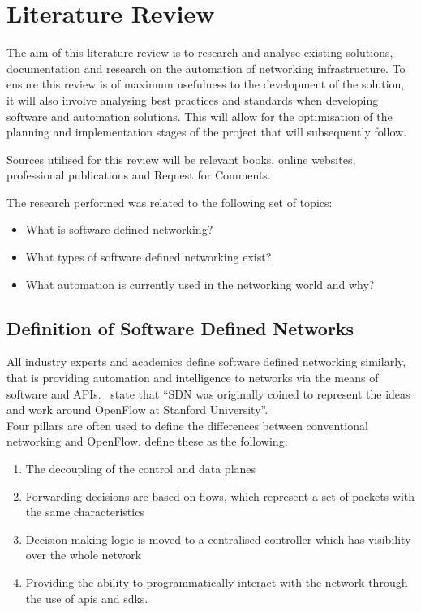 \chapter{Literature Review}
\label{chap:litreview}
The aim of this literature
review is to research and analyse existing
solutions, documentation and
research on the automation of networking
infrastructure. To ensure this review
is of maximum usefulness to the development of the solution, it will also
involve analysing best practices and
standards when developing software and
automation solutions. This will allow
for the optimisation of the planning and
implementation stages of the project
that will subsequently follow.

Sources utilised
for this review will be relevant
books, online websites,
professional
publications and Request for Comments.

The research performed was related to the following set of
topics:
\begin{itemize}
      \item What is software defined networking?
      \item What types of software defined networking exist?
      \item What automation is currently used in the networking world and why?
\end{itemize}

\section{Definition of Software Defined Networks}
\label{litreview:definition}

All industry experts and academics define
software defined networking
similarly, that is providing automation and
intelligence to networks via the
means of software and APIs.~\citet{11} state
that ``SDN was originally coined
to represent the ideas and work around
OpenFlow at Stanford University''.\\
Four pillars are often used to define the differences between conventional
networking and OpenFlow. \citet{11} define these as the
following:
\begin{enumerate}
      \item The decoupling of the control and data planes
      \item Forwarding decisions are based on flows, which represent a set of packets with the same characteristics
      \item Decision-making logic is moved to a centralised controller which has visibility over the whole network
      \item Providing the ability to programmatically interact with the network through the use of \gls{api}s and \gls{sdk}s.
\end{enumerate}

